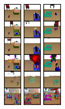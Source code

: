 \begin{figure}[t]
\begin{subfigure}[b]{0.32\textwidth}
{                %
                 { \includegraphics[width=0.1\textwidth]{val/imgs/samples/sim1/s5.png} } \hspace{-12px}
                 { \includegraphics[width=0.1\textwidth]{val/imgs/samples/sim1/f1.png} } \hspace{-12px}
                 { \includegraphics[width=0.1\textwidth]{val/imgs/samples/sim1/f2.png} } \hspace{-12px}
            }
    

\end{subfigure}
\end{figure}
